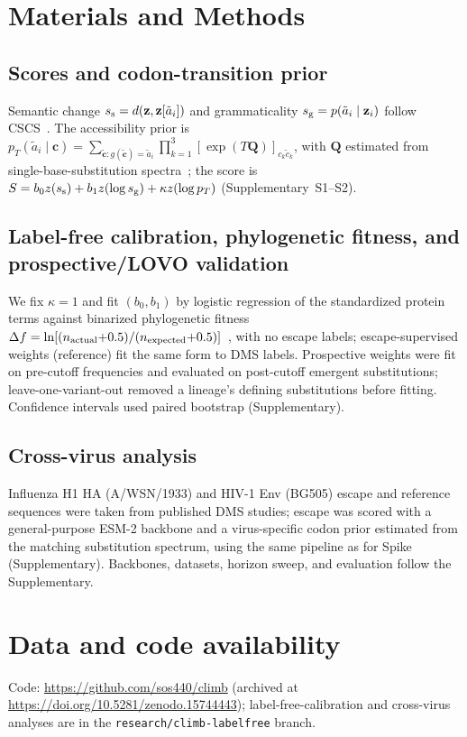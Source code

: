 \documentclass[11pt]{article}
\begin{document}
\section*{Materials and Methods}

\subsection*{Scores and codon-transition prior}
Semantic change $s_{\rm s}=d(\mathbf z,\mathbf z[\tilde a_i])$ and grammaticality $s_{\rm g}=p(\tilde a_i\mid\mathbf z_i)$ follow CSCS~\cite{hie2021learning}. The accessibility prior is $p_T(\tilde a_i\mid\mathbf c)=\sum_{\tilde{\mathbf c}:g(\tilde{\mathbf c})=\tilde a_i}\prod_{k=1}^3[\exp(T\bm Q)]_{c_k\tilde c_k}$, with $\bm Q$ estimated from single-base-substitution spectra~\cite{Yi2021Mutational}; the score is $S=b_0 z(s_{\rm s})+b_1 z(\log s_{\rm g})+\kappa z(\log p_T)$ (Supplementary~S1--S2).

\subsection*{Label-free calibration, phylogenetic fitness, and prospective/LOVO validation}
We fix $\kappa=1$ and fit $(b_0,b_1)$ by logistic regression of the standardized protein terms against binarized phylogenetic fitness $\Delta f=\ln[(n_{\rm actual}{+}0.5)/(n_{\rm expected}{+}0.5)]$~\cite{bloom2023fitness}, with no escape labels; escape-supervised weights (reference) fit the same form to DMS labels. Prospective weights were fit on pre-cutoff frequencies and evaluated on post-cutoff emergent substitutions; leave-one-variant-out removed a lineage's defining substitutions before fitting. Confidence intervals used paired bootstrap (Supplementary).

\subsection*{Cross-virus analysis}
Influenza H1 HA (A/WSN/1933) and HIV-1 Env (BG505) escape and reference sequences were taken from published DMS studies; escape was scored with a general-purpose ESM-2 backbone and a virus-specific codon prior estimated from the matching substitution spectrum, using the same pipeline as for Spike (Supplementary). Backbones, datasets, horizon sweep, and evaluation follow the Supplementary.

\section*{Data and code availability}
Code: \url{https://github.com/sos440/climb} (archived at \url{https://doi.org/10.5281/zenodo.15744443}); label-free-calibration and cross-virus analyses are in the \texttt{research/climb-labelfree} branch.



\end{document}
